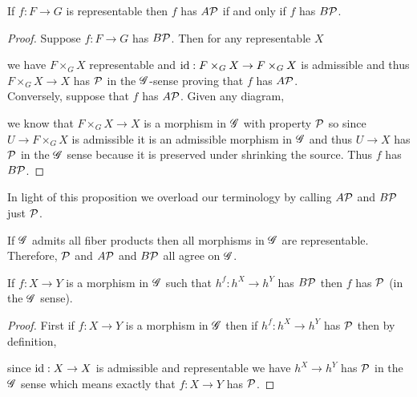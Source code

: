 \documentclass[12pt]{article}
\begin{document}
\begin{prop}
If $f : F \to G$ is representable then $f$ has $A \mathcal{P}$ if and only if $f$ has $B \mathcal{P}$.
\end{prop}

\begin{proof}
Suppose $f : F \to G$ has $B\mathcal{P}$. Then for any representable $X$
\begin{center}
\end{center}
we have $F \times_G X$ representable and $\mathrm{id} : F \times_G X \to F \times_G X$ is admissible and thus $F \times_G X \to X$ has $\mathcal{P}$ in the $\mathscr{G}$-sense proving that $f$ has $A\mathcal{P}$. 
\bigskip\\
Conversely, suppose that $f$ has $A\mathcal{P}$. Given any diagram,
\begin{center}
\end{center}
we know that $F \times_G X \to X$ is a morphism in $\mathscr{G}$ with property $\mathcal{P}$ so since $U \to F \times_G X$ is admissible it is an admissible morphism in $\mathscr{G}$ and thus $U \to X$ has $\mathcal{P}$ in the $\mathscr{G}$ sense because it is preserved under shrinking the source. Thus $f$ has $B \mathcal{P}$.
\end{proof}

\begin{rmk}
In light of this proposition we overload our terminology by calling $A \mathcal{P}$ and $B \mathcal{P}$ just $\mathcal{P}$.
\end{rmk}

\begin{cor}
If $\mathscr{G}$ admits all fiber products then all morphisms in $\mathscr{G}$ are representable. Therefore, $\mathcal{P}$ and $A \mathcal{P}$ and $B \mathcal{P}$ all agree on $\mathscr{G}$.
\end{cor}

\begin{prop}
If $f : X \to Y$ is a morphism in $\mathscr{G}$ such that $h^f : h^X \to h^Y$ has $B \mathcal{P}$ then $f$ has $\mathcal{P}$ (in the $\mathscr{G}$ sense).
\end{prop}

\begin{proof}
First if $f : X \to Y$ is a morphism in $\mathscr{G}$ then if $h^f : h^X \to h^Y$ has $\mathcal{P}$ then by definition,
\begin{center}
\end{center}
since $\mathrm{id} : X \to X$ is admissible and representable we have $h^X \to h^Y$ has $\mathcal{P}$ in the $\mathscr{G}$ sense which means exactly that $f : X \to Y$ has $\mathcal{P}$. 
\end{proof}
\end{document}
